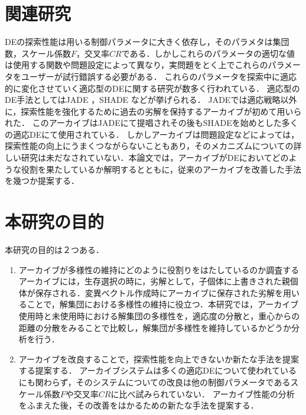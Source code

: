 \documentclass[a4paper,11pt,oneside,openany]{jsbook}
\begin{document}
\section{関連研究}
DEの探索性能は用いる制御パラメータに大きく依存し，そのパラメタは集団数，スケール係数$F$，交叉率$CR$である．しかしこれらのパラメータの適切な値は使用する関数や問題設定によって異なり，実問題をとく上でこれらのパラメータをユーザーが試行錯誤する必要がある．
これらのパラメータを探索中に適応的に変化させていく適応型のDEに関する研究が数多く行われている．
適応型のDE手法としてはJADE \cite{JADE} ，SHADE \cite{SHADE} などが挙げられる．
JADEでは適応戦略以外に，探索性能を強化するために過去の劣解を保持するアーカイブが初めて用いられた．
このアーカイブはJADEにて提唱されその後もSHADEを始めとした多くの適応DEにて使用されている．
しかしアーカイブは問題設定などによっては，探索性能の向上にうまくつながらないこともあり，そのメカニズムについての詳しい研究は未だなされていない．本論文では，アーカイブがDEにおいてどのような役割を果たしているか解明するとともに，従来のアーカイブを改善した手法を幾つか提案する．

\section{本研究の目的}
本研究の目的は２つある．
\begin{enumerate}
\item アーカイブが多様性の維持にどのように役割りをはたしているのか調査する
\vspace{3mm}
\newline
アーカイブには，生存選択の時に，劣解として，子個体に上書きされた親個体が保存される．変異ベクトル作成時にアーカイブに保存された劣解を用いることで，解集団における多様性の維持に役立つ．本研究では，アーカイブ使用時と未使用時における解集団の多様性を，適応度の分散と，重心からの距離の分散をみることで比較し，解集団が多様性を維持しているかどうか分析を行う．
\newline


\item アーカイブを改良することで，探索性能を向上できないか新たな手法を提案する提案する．
\vspace{3mm}
\newline
アーカイブシステムは多くの適応DEについて使われているにも関わらず，そのシステムについての改良は他の制御パラメータであるスケール係数$F$や交叉率$CR$に比べ試みられていない．
アーカイブ性能の分析をふまえた後，その改善をはかるための新たな手法を提案する．
\end{enumerate}
\end{document}
